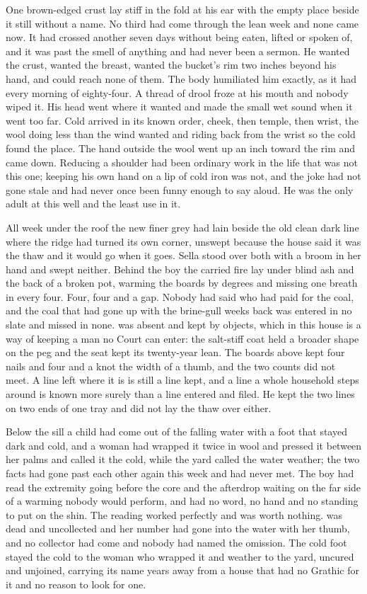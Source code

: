 One brown-edged crust lay stiff in the fold at his ear with the empty place beside it still without a name. No third had come through the lean week and none came now. It had crossed another seven days without being eaten, lifted or spoken of, and it was past the smell of anything and had never been a sermon. He wanted the crust, wanted the breast, wanted the bucket's rim two inches beyond his hand, and could reach none of them. The body humiliated him exactly, as it had every morning of eighty-four. A thread of drool froze at his mouth and nobody wiped it. His head went where it wanted and made the small wet sound when it went too far. Cold arrived in its known order, cheek, then temple, then wrist, the wool doing less than the wind wanted and riding back from the wrist so the cold found the place. The hand outside the wool went up an inch toward the rim and came down. Reducing a shoulder had been ordinary work in the life that was not this one; keeping his own hand on a lip of cold iron was not, and the joke had not gone stale and had never once been funny enough to say aloud. He was the only adult at this well and the least use in it.

All week under the roof the new finer grey had lain beside the old clean dark line where the  ridge had turned its own corner, unswept because the house said it was the thaw and it would go when it goes. Sella stood over both with a broom in her hand and swept neither. Behind the boy the carried fire lay under blind ash and the back of a broken pot, warming the boards by degrees and missing one breath in every four. Four, four and a gap. Nobody had said who had paid for the coal, and the coal that had gone up with the brine-gull weeks back was entered in no slate and missed in none.  was absent and kept by objects, which in this house is a way of keeping a man no Court can enter: the salt-stiff coat held a broader shape on the peg and the seat kept its twenty-year lean. The boards above kept four nails and four and a knot the width of a thumb, and the two counts did not meet. A line left where it is is still a line kept, and a line a whole household steps around is known more surely than a line entered and filed. He kept the two lines on two ends of one tray and did not lay the thaw over either.

Below the sill a child had come out of the falling water with a foot that stayed dark and cold, and a woman had wrapped it twice in wool and pressed it between her palms and called it the cold, while the yard called the water weather; the two facts had gone past each other again this week and had never met. The boy had read the extremity going before the core and the afterdrop waiting on the far side of a warming nobody would perform, and had no word, no hand and no standing to put on the shin. The reading worked perfectly and was worth nothing.  was dead and uncollected and her number had gone into the water with her thumb, and no collector had come and nobody had named the omission. The cold foot stayed the cold to the woman who wrapped it and weather to the yard, uncured and unjoined, carrying its name years away from a house that had no Grathic for it and no reason to look for one.


